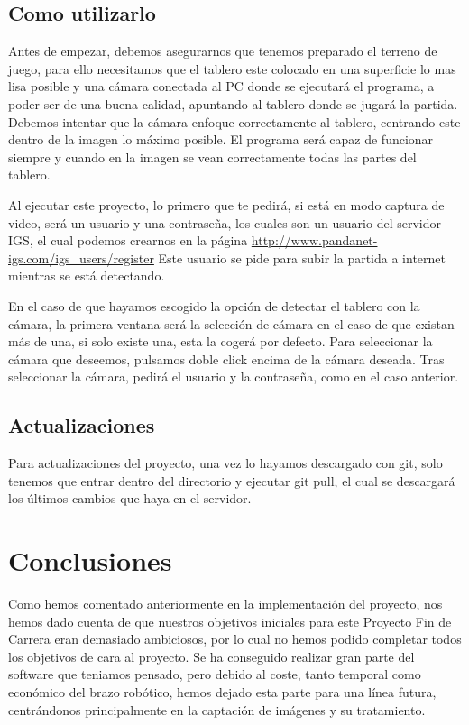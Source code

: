 \documentclass[12pt,a4paper]{report}
\begin{document}
\section{Como utilizarlo}

Antes de empezar, debemos asegurarnos que tenemos preparado el terreno de juego,
para ello necesitamos que el tablero este colocado en una superficie lo mas lisa
posible y una cámara conectada al PC donde se ejecutará el programa, a poder
ser de una buena calidad, apuntando al tablero donde se jugará la partida.
Debemos intentar que la cámara enfoque correctamente al tablero, centrando este
dentro de la imagen lo máximo posible. El programa será capaz de funcionar
siempre y cuando en la imagen se vean correctamente todas las partes del
tablero.

Al ejecutar este proyecto, lo primero que te pedirá, si está en modo captura de
video, será un usuario y una contraseña, los cuales son un usuario del servidor
IGS, el cual podemos crearnos en la página 
\url{http://www.pandanet-igs.com/igs_users/register}
Este usuario se pide para subir la partida a internet mientras se está
detectando. 

En el caso de que hayamos escogido la opción de detectar el tablero con la
cámara, la primera ventana será la selección de cámara en el caso de que existan
más de una, si solo existe una, esta la cogerá por defecto. Para seleccionar la
cámara que deseemos, pulsamos doble click encima de la cámara deseada.  Tras
seleccionar la cámara, pedirá el usuario y la contraseña, como en el caso
anterior. 


\section{Actualizaciones}

Para actualizaciones del proyecto, una vez lo hayamos descargado con git, solo
tenemos que entrar dentro del directorio y ejecutar git pull, el cual se
descargará los últimos cambios que haya en el servidor. 


\chapter{Conclusiones}

Como hemos comentado anteriormente en la implementación del proyecto, nos hemos
dado cuenta de que nuestros objetivos iniciales para este Proyecto Fin de
Carrera eran demasiado ambiciosos, por lo cual no hemos podido completar todos
los objetivos de cara al proyecto. Se ha conseguido realizar gran parte del
software que teniamos pensado, pero debido al coste, tanto temporal como
económico del brazo robótico, hemos dejado esta parte para una línea futura,
centrándonos principalmente en la captación de imágenes y su tratamiento.
\end{document}
